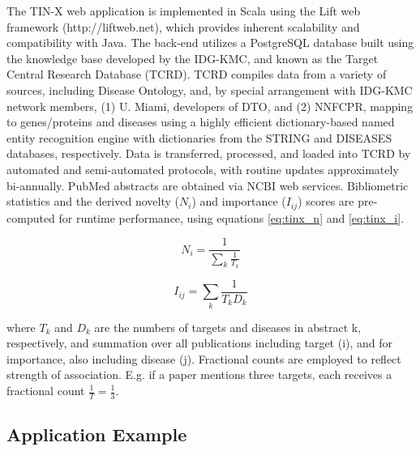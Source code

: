 The TIN-X web application is implemented in Scala using the Lift web framework (http://liftweb.net), which provides inherent scalability and compatibility with Java.  The back-end utilizes a PostgreSQL database built using the knowledge base developed by the IDG-KMC, and known as the Target Central Research Database (TCRD)\cite{Nguyen2017-lo}.  TCRD compiles data from a variety of sources, including Disease Ontology, and, by special arrangement with IDG-KMC network members, (1) U. Miami, developers of DTO, and (2) NNFCPR, mapping to genes/proteins and diseases using a highly efficient dictionary-based named entity recognition engine\cite{Pafilis2013-ml} with dictionaries from the STRING\cite{Szklarczyk2015-bl} and DISEASES\cite{Pletscher-Frankild2015-oo} databases, respectively.  Data is transferred, processed, and loaded into TCRD by automated and semi-automated protocols, with routine updates approximately bi-annually.  PubMed abstracts are obtained via NCBI web services.  Bibliometric statistics and the derived novelty ($N_i$) and importance ($I_{ij}$) scores are pre-computed for runtime performance, using equations \ref{eq:tinx_n} and \ref{eq:tinx_i}.

\begin{equation}
N_i = \frac{1}{\sum_{k}^{}\frac{1}{T_k}}
\label{eq:tinx_n}
\end{equation}

\begin{equation}
I_{ij} = \sum_{k}^{}\frac{1}{T_kD_k}
\label{eq:tinx_i}
\end{equation}

where $T_k$ and $D_k$ are the numbers of targets and diseases in abstract k, respectively, and summation over all publications including target (i), and for importance, also including disease (j). Fractional counts are employed to reflect strength of association.  E.g. if a paper mentions three targets, each receives a fractional count $\frac{1}{T} = \frac{1}{3}$.

\subsection{Application Example}

